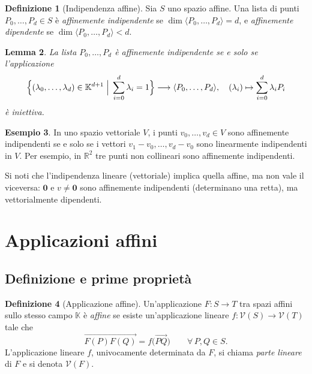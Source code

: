 \documentclass[11pt, a4paper]{book}
\theoremstyle{definition}
\newtheorem{definizione}{Definizione}[section]
\newtheorem{esempio}[definizione]{Esempio}
\theoremstyle{plain}
\newtheorem{lemma}[definizione]{Lemma}
\theoremstyle{remark}
\newcommand{\R}{\mathbb{R}}
\newcommand{\K}{\mathbb{K}}
\newcommand{\VV}{\mathcal{V}}   %
\begin{document}
\begin{defbox}
\begin{definizione}[Indipendenza affine]
\label{def:ind-affine}
Sia $S$ uno spazio affine. Una lista di punti $P_0, \ldots, P_d \in S$ è \emph{affinemente indipendente} se $\dim \langle P_0, \ldots, P_d \rangle = d$, e \emph{affinemente dipendente} se $\dim \langle P_0, \ldots, P_d \rangle < d$.
\end{definizione}
\end{defbox}

\begin{lemma}
\label{lem:ind-affine-car}
La lista $P_0, \ldots, P_d$ è affinemente indipendente se e solo se l'applicazione
\[
  \Bigl\{ (\lambda_0,\ldots,\lambda_d) \in \K^{d+1} \;\Big|\; \sum_{i=0}^d \lambda_i = 1 \Bigr\} \longrightarrow \langle P_0,\ldots,P_d \rangle, \quad (\lambda_i) \mapsto \sum_{i=0}^d \lambda_i P_i
\]
è iniettiva.
\end{lemma}

\begin{exbox}
\begin{esempio}
In uno spazio vettoriale $V$, i punti $v_0, \ldots, v_d \in V$ sono affinemente indipendenti se e solo se i vettori $v_1 - v_0, \ldots, v_d - v_0$ sono linearmente indipendenti in $V$. Per esempio, in $\R^2$ tre punti non collineari sono affinemente indipendenti.

Si noti che l'indipendenza lineare (vettoriale) implica quella affine, ma non vale il viceversa: $\mathbf{0}$ e $v \neq \mathbf{0}$ sono affinemente indipendenti (determinano una retta), ma vettorialmente dipendenti.
\end{esempio}
\end{exbox}

\section{Applicazioni affini}
\label{sec:appl-affini}

\subsection{Definizione e prime proprietà}

\begin{defbox}
\begin{definizione}[Applicazione affine]
\label{def:appl-affine}
Un'applicazione $F \colon S \to T$ tra spazi affini sullo stesso campo $\K$ è \emph{affine} se esiste un'applicazione lineare $f \colon \VV(S) \to \VV(T)$ tale che
\[
  \overrightarrow{F(P)F(Q)} = f\bigl(\overrightarrow{PQ}\bigr) \qquad \forall\, P, Q \in S.
\]
L'applicazione lineare $f$, univocamente determinata da $F$, si chiama \emph{parte lineare} di $F$ e si denota $\VV(F)$.
\end{definizione}
\end{defbox}
\end{document}
